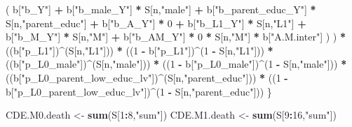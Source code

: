 \documentclass[
]{book}
\newenvironment{Shaded}{\begin{snugshade}}{\end{snugshade}}
\newcommand{\DecValTok}[1]{\textcolor[rgb]{0.00,0.00,0.81}{#1}}
\newcommand{\FunctionTok}[1]{\textcolor[rgb]{0.13,0.29,0.53}{\textbf{#1}}}
\newcommand{\NormalTok}[1]{#1}
\newcommand{\OtherTok}[1]{\textcolor[rgb]{0.56,0.35,0.01}{#1}}
\newcommand{\SpecialCharTok}[1]{\textcolor[rgb]{0.81,0.36,0.00}{\textbf{#1}}}
\newcommand{\StringTok}[1]{\textcolor[rgb]{0.31,0.60,0.02}{#1}}
\begin{document}
\begin{Shaded}
\begin{Highlighting}[]
\NormalTok{                      ( b[}\StringTok{"b\_Y"}\NormalTok{] }\SpecialCharTok{+} 
\NormalTok{                          b[}\StringTok{"b\_male\_Y"}\NormalTok{] }\SpecialCharTok{*}\NormalTok{ S[n,}\StringTok{"male"}\NormalTok{] }\SpecialCharTok{+} 
\NormalTok{                          b[}\StringTok{"b\_parent\_educ\_Y"}\NormalTok{] }\SpecialCharTok{*}\NormalTok{ S[n,}\StringTok{"parent\_educ"}\NormalTok{] }\SpecialCharTok{+} 
\NormalTok{                          b[}\StringTok{"b\_A\_Y"}\NormalTok{] }\SpecialCharTok{*} \DecValTok{0} \SpecialCharTok{+} 
\NormalTok{                          b[}\StringTok{"b\_L1\_Y"}\NormalTok{] }\SpecialCharTok{*}\NormalTok{ S[n,}\StringTok{"L1"}\NormalTok{] }\SpecialCharTok{+}
\NormalTok{                          b[}\StringTok{"b\_M\_Y"}\NormalTok{] }\SpecialCharTok{*}\NormalTok{ S[n,}\StringTok{"M"}\NormalTok{] }\SpecialCharTok{+}
\NormalTok{                          b[}\StringTok{"b\_AM\_Y"}\NormalTok{] }\SpecialCharTok{*} \DecValTok{0} \SpecialCharTok{*}\NormalTok{ S[n,}\StringTok{"M"}\NormalTok{] }\SpecialCharTok{*}\NormalTok{ b[}\StringTok{"A.M.inter"}\NormalTok{] ) ) }\SpecialCharTok{*}
\NormalTok{      ((b[}\StringTok{"p\_L1"}\NormalTok{])}\SpecialCharTok{\^{}}\NormalTok{(S[n,}\StringTok{"L1"}\NormalTok{])) }\SpecialCharTok{*}
\NormalTok{      ((}\DecValTok{1} \SpecialCharTok{{-}}\NormalTok{ b[}\StringTok{"p\_L1"}\NormalTok{])}\SpecialCharTok{\^{}}\NormalTok{(}\DecValTok{1} \SpecialCharTok{{-}}\NormalTok{ S[n,}\StringTok{"L1"}\NormalTok{])) }\SpecialCharTok{*}
\NormalTok{      ((b[}\StringTok{"p\_L0\_male"}\NormalTok{])}\SpecialCharTok{\^{}}\NormalTok{(S[n,}\StringTok{"male"}\NormalTok{])) }\SpecialCharTok{*} 
\NormalTok{      ((}\DecValTok{1} \SpecialCharTok{{-}}\NormalTok{ b[}\StringTok{"p\_L0\_male"}\NormalTok{])}\SpecialCharTok{\^{}}\NormalTok{(}\DecValTok{1} \SpecialCharTok{{-}}\NormalTok{ S[n,}\StringTok{"male"}\NormalTok{])) }\SpecialCharTok{*} 
\NormalTok{      ((b[}\StringTok{"p\_L0\_parent\_low\_educ\_lv"}\NormalTok{])}\SpecialCharTok{\^{}}\NormalTok{(S[n,}\StringTok{"parent\_educ"}\NormalTok{])) }\SpecialCharTok{*}
\NormalTok{      ((}\DecValTok{1} \SpecialCharTok{{-}}\NormalTok{ b[}\StringTok{"p\_L0\_parent\_low\_educ\_lv"}\NormalTok{])}\SpecialCharTok{\^{}}\NormalTok{(}\DecValTok{1} \SpecialCharTok{{-}}\NormalTok{ S[n,}\StringTok{"parent\_educ"}\NormalTok{])) }
\NormalTok{    \}}
  
\NormalTok{  CDE.M0.death }\OtherTok{\textless{}{-}} \FunctionTok{sum}\NormalTok{(S[}\DecValTok{1}\SpecialCharTok{:}\DecValTok{8}\NormalTok{,}\StringTok{"sum"}\NormalTok{])}
\NormalTok{  CDE.M1.death }\OtherTok{\textless{}{-}} \FunctionTok{sum}\NormalTok{(S[}\DecValTok{9}\SpecialCharTok{:}\DecValTok{16}\NormalTok{,}\StringTok{"sum"}\NormalTok{])}
  

\end{Highlighting}
\end{Shaded}
\end{document}
